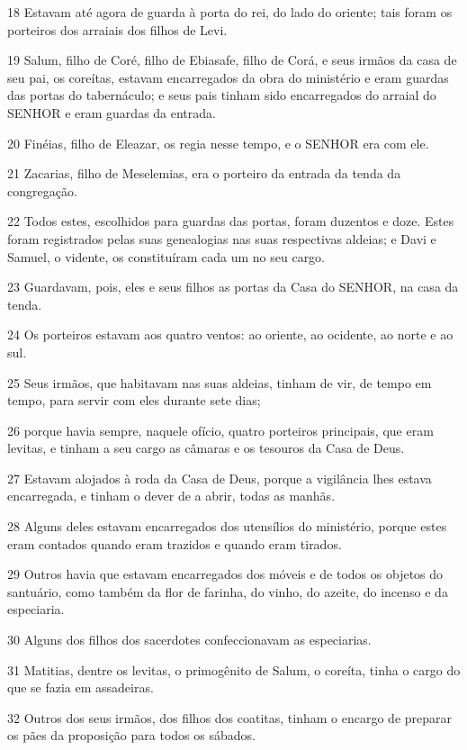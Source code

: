 \par 18 Estavam até agora de guarda à porta do rei, do lado do oriente; tais foram os porteiros dos arraiais dos filhos de Levi.
\par 19 Salum, filho de Coré, filho de Ebiasafe, filho de Corá, e seus irmãos da casa de seu pai, os coreítas, estavam encarregados da obra do ministério e eram guardas das portas do tabernáculo; e seus pais tinham sido encarregados do arraial do SENHOR e eram guardas da entrada.
\par 20 Finéias, filho de Eleazar, os regia nesse tempo, e o SENHOR era com ele.
\par 21 Zacarias, filho de Meselemias, era o porteiro da entrada da tenda da congregação.
\par 22 Todos estes, escolhidos para guardas das portas, foram duzentos e doze. Estes foram registrados pelas suas genealogias nas suas respectivas aldeias; e Davi e Samuel, o vidente, os constituíram cada um no seu cargo.
\par 23 Guardavam, pois, eles e seus filhos as portas da Casa do SENHOR, na casa da tenda.
\par 24 Os porteiros estavam aos quatro ventos: ao oriente, ao ocidente, ao norte e ao sul.
\par 25 Seus irmãos, que habitavam nas suas aldeias, tinham de vir, de tempo em tempo, para servir com eles durante sete dias;
\par 26 porque havia sempre, naquele ofício, quatro porteiros principais, que eram levitas, e tinham a seu cargo as câmaras e os tesouros da Casa de Deus.
\par 27 Estavam alojados à roda da Casa de Deus, porque a vigilância lhes estava encarregada, e tinham o dever de a abrir, todas as manhãs.
\par 28 Alguns deles estavam encarregados dos utensílios do ministério, porque estes eram contados quando eram trazidos e quando eram tirados.
\par 29 Outros havia que estavam encarregados dos móveis e de todos os objetos do santuário, como também da flor de farinha, do vinho, do azeite, do incenso e da especiaria.
\par 30 Alguns dos filhos dos sacerdotes confeccionavam as especiarias.
\par 31 Matitias, dentre os levitas, o primogênito de Salum, o coreíta, tinha o cargo do que se fazia em assadeiras.
\par 32 Outros dos seus irmãos, dos filhos dos coatitas, tinham o encargo de preparar os pães da proposição para todos os sábados.
